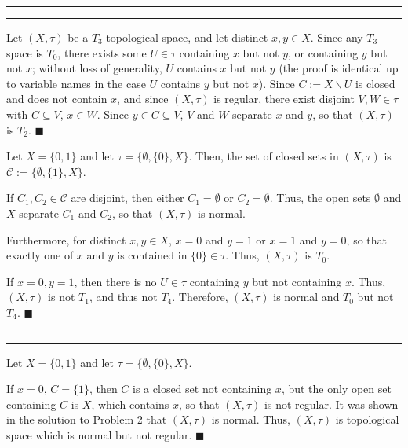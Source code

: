 \documentclass[11pt]{article}
\newcounter{questionCounter}
\newcounter{partCounter}[questionCounter]
\newenvironment{question}[2][\arabic{questionCounter}]{%
    \setcounter{partCounter}{0}%
    \vspace{.25in} \hrule \vspace{0.5em}%
        \noindent{\bf #2}%
    \vspace{0.8em} \hrule \vspace{.10in}%
    \addtocounter{questionCounter}{1}%
}{}
\renewcommand{\qed}{\quad $\blacksquare$}
\newcommand{\sminus}{\backslash}
\begin{document}
\begin{question}{Problem 2}
Let $(X,\tau)$ be a $T_3$ topological space, and let distinct $x,y \in X$.
Since any $T_3$ space is $T_0$, there exists some $U \in \tau$ containing $x$
but not $y$, or containing $y$ but not $x$; without loss of generality,
$U$ contains $x$ but not $y$ (the proof is identical up to variable names in
the case $U$ contains $y$ but not $x$). Since $C := X \sminus U$ is closed and
does not contain $x$, and since $(X,\tau)$ is regular, there exist disjoint
$V,W \in \tau$ with $C \subseteq V$, $x \in W$. Since $y \in C \subseteq V$,
$V$ and $W$ separate $x$ and $y$, so that $(X,\tau)$ is $T_2$. \qed

Let $X = \{0,1\}$ and let $\tau = \{\emptyset,\{0\},X\}$. Then, the set
of closed sets in $(X,\tau)$ is $\mathcal{C} := \{\emptyset,\{1\},X\}$.

If $C_1,C_2 \in \mathcal{C}$ are disjoint, then either $C_1 = \emptyset$ or
$C_2 = \emptyset$. Thus, the open sets $\emptyset$ and $X$ separate
$C_1$ and $C_2$, so that $(X,\tau)$ is normal.

Furthermore, for distinct $x,y \in X$, $x = 0$ and $y = 1$ or $x = 1$ and
$y = 0$, so that exactly one of $x$ and $y$ is contained in $\{0\} \in \tau$.
Thus, $(X,\tau)$ is $T_0$.

If $x = 0,y = 1$, then there is no $U \in \tau$ containing $y$ but not
containing $x$. Thus, $(X,\tau)$ is not $T_1$, and thus not $T_4$.
Therefore, $(X,\tau)$ is normal and $T_0$ but not $T_4$. \qed
\end{question}

\begin{question}{Problem 3}
Let $X = \{0,1\}$ and let $\tau = \{\emptyset,\{0\},X\}$.

If $x = 0$, $C = \{1\}$, then $C$ is a closed set not containing $x$, but the
only open set containing $C$ is $X$, which contains $x$, so that $(X,\tau)$ is
not regular.
It was shown in the solution to Problem 2 that $(X,\tau)$ is normal.
Thus, $(X,\tau)$ is topological space which is normal but not regular. \qed
\end{question}
\end{document}
